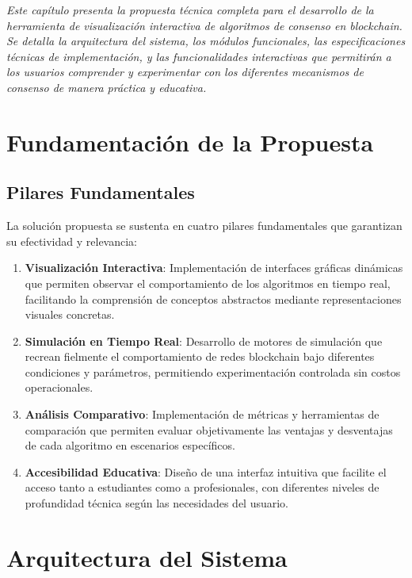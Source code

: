 \documentclass[spanish,12pt,letterpaper]{report}
\begin{document}
\textit{Este capítulo presenta la propuesta técnica completa para el desarrollo de la herramienta de visualización interactiva de algoritmos de consenso en blockchain. Se detalla la arquitectura del sistema, los módulos funcionales, las especificaciones técnicas de implementación, y las funcionalidades interactivas que permitirán a los usuarios comprender y experimentar con los diferentes mecanismos de consenso de manera práctica y educativa.}

\newpage

\section{Fundamentación de la Propuesta}

\subsection{Pilares Fundamentales}

La solución propuesta se sustenta en cuatro pilares fundamentales que garantizan su efectividad y relevancia:

\begin{enumerate}
    \item \textbf{Visualización Interactiva}: Implementación de interfaces gráficas dinámicas que permiten observar el comportamiento de los algoritmos en tiempo real, facilitando la comprensión de conceptos abstractos mediante representaciones visuales concretas.
    
    \item \textbf{Simulación en Tiempo Real}: Desarrollo de motores de simulación que recrean fielmente el comportamiento de redes blockchain bajo diferentes condiciones y parámetros, permitiendo experimentación controlada sin costos operacionales.
    
    \item \textbf{Análisis Comparativo}: Implementación de métricas y herramientas de comparación que permiten evaluar objetivamente las ventajas y desventajas de cada algoritmo en escenarios específicos.
    
    \item \textbf{Accesibilidad Educativa}: Diseño de una interfaz intuitiva que facilite el acceso tanto a estudiantes como a profesionales, con diferentes niveles de profundidad técnica según las necesidades del usuario.
\end{enumerate}

\section{Arquitectura del Sistema}
\end{document}

